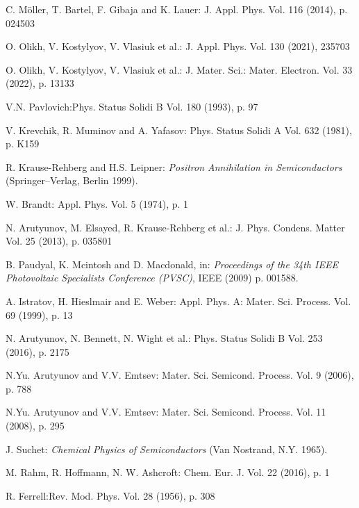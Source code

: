 \documentclass{ttp}
\begin{document}
\begin{thebibliography}{99}
 C. M\"{o}ller, T. Bartel, F. Gibaja and K. Lauer: J. Appl. Phys. Vol. 116 (2014), p. 024503

 O. Olikh, V. Kostylyov, V. Vlasiuk et al.: J. Appl. Phys. Vol. 130 (2021), 235703

 O. Olikh, V. Kostylyov, V. Vlasiuk et al.: J. Mater. Sci.: Mater. Electron. Vol. 33 (2022), p. 13133

 V.N. Pavlovich:Phys. Status Solidi B Vol. 180 (1993), p. 97

  V. Krevchik, R. Muminov and A. Yafasov: Phys. Status Solidi A Vol. 632 (1981), p. K159

 R. Krause-Rehberg and H.S. Leipner: \textit{Positron Annihilation in Semiconductors }(Springer–Verlag, Berlin 1999).

W. Brandt: Appl. Phys. Vol. 5 (1974), p. 1

 N. Arutyunov, M. Elsayed, R. Krause-Rehberg et al.: J. Phys. Condens. Matter Vol. 25 (2013), p. 035801

 B. Paudyal, K. Mcintosh and D. Macdonald, in: \textit{Proceedings of the 34th 
IEEE Photovoltaic Specialists Conference (PVSC)}, IEEE (2009) p. 001588.

 A. Istratov, H. Hieslmair and E. Weber: Appl. Phys. A: Mater. Sci. Process. Vol. 69 (1999), p. 13

  N. Arutyunov, N. Bennett, N. Wight et al.: Phys. Status Solidi B Vol. 253 (2016), p. 2175

 N.Yu. Arutyunov and V.V. Emtsev: Mater. Sci. Semicond. Process. Vol. 9 (2006), p. 788

 N.Yu. Arutyunov and V.V. Emtsev: Mater. Sci. Semicond. Process. Vol. 11 (2008), p. 295

 J. Suchet: \textit{Chemical Physics of Semiconductors }(Van Nostrand, N.Y. 1965).

 M. Rahm, R. Hoffmann, N. W. Ashcroft: Chem. Eur. J. Vol. 22 (2016), p. 1

 R. Ferrell:Rev. Mod. Phys. Vol. 28 (1956), p. 308

\end{thebibliography}
\end{document}

